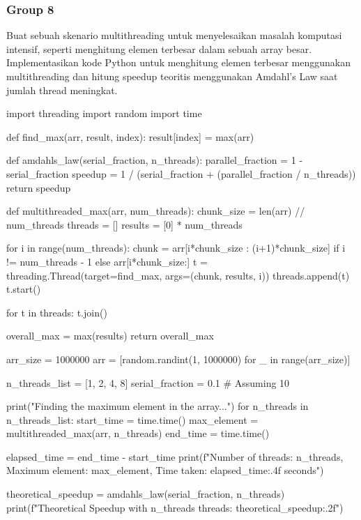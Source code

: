 \documentclass[12pt]{article}
\begin{document}
\subsubsection{Group 8}
Buat sebuah skenario multithreading untuk menyelesaikan masalah komputasi intensif, seperti menghitung elemen terbesar dalam sebuah array besar. Implementasikan kode Python untuk menghitung elemen terbesar menggunakan multithreading dan hitung speedup teoritis menggunakan Amdahl’s Law saat jumlah thread meningkat.
\begin{python}
    import threading
    import random
    import time
    
    
    def find_max(arr, result, index):
        result[index] = max(arr)
    
    
    def amdahls_law(serial_fraction, n_threads):
        parallel_fraction = 1 - serial_fraction
        speedup = 1 / (serial_fraction + (parallel_fraction / n_threads))
        return speedup
    
    
    def multithreaded_max(arr, num_threads):
        chunk_size = len(arr) // num_threads
        threads = []
        results = [0] * num_threads
    
        for i in range(num_threads):
            chunk = arr[i*chunk_size : (i+1)*chunk_size] if i != num_threads - 1 else arr[i*chunk_size:]
            t = threading.Thread(target=find_max, args=(chunk, results, i))
            threads.append(t)
            t.start()
    
        for t in threads:
            t.join()
    
        overall_max = max(results)
        return overall_max
    
    
    arr_size = 1000000
    arr = [random.randint(1, 1000000) for _ in range(arr_size)]
    
    
    n_threads_list = [1, 2, 4, 8]
    serial_fraction = 0.1  # Assuming 10%
    
    print("Finding the maximum element in the array...")
    for n_threads in n_threads_list:
        start_time = time.time()
        max_element = multithreaded_max(arr, n_threads)
        end_time = time.time()
    
        elapsed_time = end_time - start_time
        print(f"Number of threads: {n_threads}, Maximum element: {max_element}, Time taken: {elapsed_time:.4f} seconds")
    
        
        theoretical_speedup = amdahls_law(serial_fraction, n_threads)
        print(f"Theoretical Speedup with {n_threads} threads: {theoretical_speedup:.2f}\n")    
\end{python}
\end{document}
